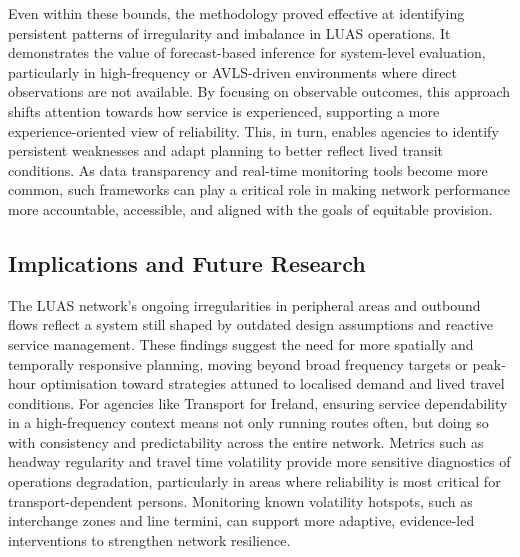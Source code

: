     Even within these bounds, the methodology proved effective at identifying persistent patterns of irregularity and imbalance in LUAS operations. It demonstrates the value of forecast-based inference for system-level evaluation, particularly in high-frequency or AVLS-driven environments where direct observations are not available. By focusing on observable outcomes, this approach shifts attention towards how service is experienced, supporting a more experience-oriented view of reliability. This, in turn, enables agencies to identify persistent weaknesses and adapt planning to better reflect lived transit conditions. As data transparency and real-time monitoring tools become more common, such frameworks can play a critical role in making network performance more accountable, accessible, and aligned with the goals of equitable provision.

\subsection*{Implications and Future Research}

    The LUAS network’s ongoing irregularities in peripheral areas and outbound flows reflect a system still shaped by outdated design assumptions and reactive service management. These findings suggest the need for more spatially and temporally responsive planning, moving beyond broad frequency targets or peak-hour optimisation toward strategies attuned to localised demand and lived travel conditions. For agencies like Transport for Ireland, ensuring service dependability in a high-frequency context means not only running routes often, but doing so with consistency and predictability across the entire network. Metrics such as headway regularity and travel time volatility provide more sensitive diagnostics of operations degradation, particularly in areas where reliability is most critical for transport-dependent persons. Monitoring known volatility hotspots, such as interchange zones and line termini, can support more adaptive, evidence-led interventions to strengthen network resilience.

